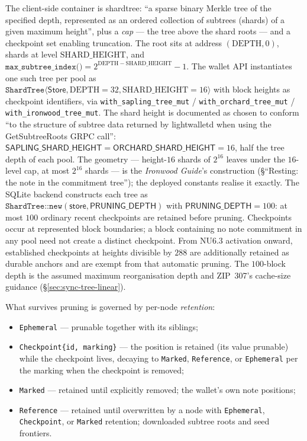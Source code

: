 \documentclass[11pt,a4paper]{article}
\theoremstyle{definition}
\begin{document}
The client-side container is \textsf{shardtree}: ``a sparse binary
Merkle tree of the specified depth, represented as an ordered collection
of subtrees (shards) of a given maximum height'', plus a \emph{cap} ---
the tree above the shard roots --- and a checkpoint set enabling
truncation. The root sits at address $(\mathrm{DEPTH}, 0)$, shards at
level $\mathrm{SHARD\_HEIGHT}$, and
$\texttt{max\_subtree\_index()} =
2^{\mathrm{DEPTH} - \mathrm{SHARD\_HEIGHT}} - 1$. The wallet API
instantiates one such tree per pool as
$\texttt{ShardTree}\langle \mathsf{Store}, \mathrm{DEPTH} = 32,
\mathrm{SHARD\_HEIGHT} = 16 \rangle$ with block heights as checkpoint
identifiers, via \texttt{with\_sapling\_\allowbreak tree\_mut} /
\texttt{with\_orchard\_\allowbreak tree\_mut} /
\texttt{with\_ironwood\_\allowbreak tree\_mut}.
The shard height is documented as chosen to conform ``to the structure
of subtree data returned by lightwalletd when using the GetSubtreeRoots
GRPC call'': $\mathsf{SAPLING\_SHARD\_HEIGHT} =
\mathsf{ORCHARD\_SHARD\_HEIGHT} = 16$, half the tree depth of each pool.
The geometry --- height-$16$
shards of $2^{16}$ leaves under the $16$-level cap, at most $2^{16}$
shards --- is the \emph{Ironwood Guide}'s construction (\S``Resting: the note
in the commitment tree''); the
deployed constants realise it exactly.
The SQLite backend constructs each tree as
$\texttt{ShardTree::new}(\mathsf{store}, \mathsf{PRUNING\_DEPTH})$ with
$\mathsf{PRUNING\_DEPTH} = 100$: at most $100$ ordinary recent
checkpoints are retained before pruning. Checkpoints occur at represented
block boundaries; a block containing no note commitment in any pool need
not create a distinct checkpoint. From NU6.3 activation onward, established
checkpoints at heights divisible by $288$ are additionally retained as
durable anchors and are exempt from that automatic pruning. The $100$-block
depth is the assumed maximum reorganisation depth and ZIP~307's cache-size
guidance (\S\ref{sec:sync-tree-linear}).

What survives pruning is governed by per-node \emph{retention}:
\begin{itemize}
\item \texttt{Ephemeral} --- prunable together with its siblings;
\item \texttt{Checkpoint\{id, marking\}} --- the position is retained
  (its value prunable) while the checkpoint lives, decaying to
  \texttt{Marked}, \texttt{Reference}, or \texttt{Ephemeral} per the
  marking when the checkpoint is removed;
\item \texttt{Marked} --- retained until explicitly removed; the wallet's
  own note positions;
\item \texttt{Reference} --- retained until overwritten by a node with
  \texttt{Ephemeral}, \texttt{Checkpoint}, or \texttt{Marked} retention;
  downloaded subtree roots and seed frontiers.
\end{itemize}
\end{document}
